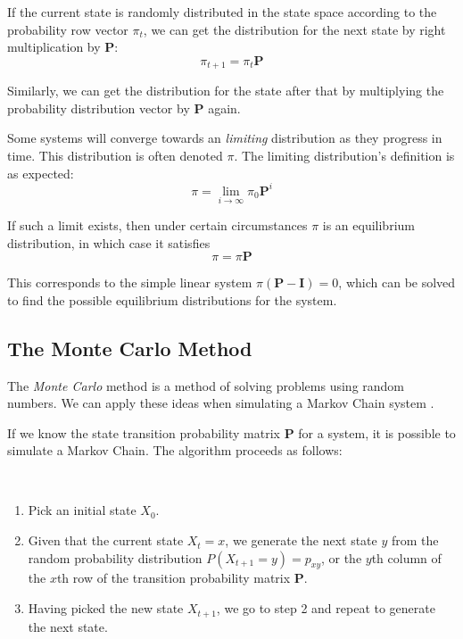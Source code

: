 If the current state is randomly distributed in the state space
according to the probability row vector $\pi_t$, we can get the
distribution for the next state by right multiplication by
$\mathbf{P}$:
\begin{equation}
\pi_{t+1} = \pi_t \mathbf{P}
\end{equation}

\noindent Similarly, we can get the distribution for the state after that
by multiplying the probability distribution vector by $\mathbf{P}$ again.

Some systems will converge towards an \emph{limiting} distribution as
they progress in time.  This distribution is often denoted $\pi$.  The
limiting distribution's definition is as expected:
\begin{equation}
\pi = \lim_{i \to \infty}\pi_0 \mathbf{P}^i
\end{equation}


\noindent If such a limit exists, then under certain circumstances
$\pi$ is an equilibrium distribution, in which case it satisfies
\begin{equation}
\pi = \pi \mathbf{P}
\end{equation}


\noindent This corresponds to the simple linear system $\pi(\mathbf{P}
- \mathbf{I}) = 0$, which can be solved to find the possible
equilibrium distributions for the system.

\subsection{The Monte Carlo Method}

The \emph{Monte Carlo} method is a method of solving problems using
random numbers.  We can apply these ideas when simulating a Markov
Chain system \cite{mcmc-in-practice}.

If we know the state transition probability matrix $\mathbf{P}$ for a
system, it is possible to simulate a Markov Chain.  The algorithm
proceeds as follows:

\begin{algorithm}
\ 

\begin{enumerate}
\item Pick an initial state $X_0$.

\item Given that the current state $X_t=x$, we generate the next state
$y$ from the random probability distribution $P(X_{t+1}=y) = p_{xy}$,
or the $y$th column of the $x$th row of the transition probability
matrix $\mathbf{P}$.

\item Having picked the new state $X_{t+1}$, we go to step 2 and
repeat to generate the next state.
\end{enumerate}
\end{algorithm}


